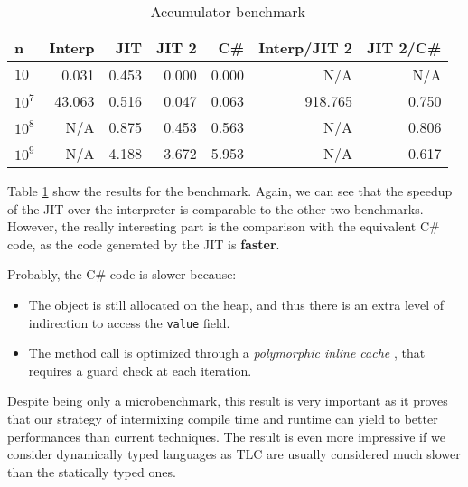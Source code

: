 \begin{table}[ht]
  \begin{tabular}{|l|r|r|r|r||r|r|}
    \hline
    \textbf{n} & 
    \textbf{Interp} &
    \textbf{JIT} &
    \textbf{JIT 2} &
    \textbf{C\#} &
    \textbf{Interp/JIT 2} &
    \textbf{JIT 2/C\#} \\
    \hline

    $10$    &   0.031  &  0.453  &  0.000  &  0.000  &      N/A  &  N/A   \\
    $10^7$  &  43.063  &  0.516  &  0.047  &  0.063  &  918.765  &  0.750 \\
    $10^8$  &     N/A  &  0.875  &  0.453  &  0.563  &      N/A  &  0.806 \\
    $10^9$  &     N/A  &  4.188  &  3.672  &  5.953  &      N/A  &  0.617 \\

    \hline

  \end{tabular}
  \caption{Accumulator benchmark}
  \label{tab:accumulator}
\end{table}


Table \ref{tab:accumulator} show the results for the benchmark.  Again, we can
see that the speedup of the JIT over the interpreter is comparable to the
other two benchmarks.  However, the really interesting part is the comparison
with the equivalent C\# code, as the code generated by the JIT is
\textbf{faster}.

Probably, the C\# code is slower because:

\begin{itemize}
\item The object is still allocated on the heap, and thus there is an extra
  level of indirection to access the \lstinline{value} field.
\item The method call is optimized through a \emph{polymorphic inline cache}
  \cite{hoelzle_optimizing_1991}, that requires a guard check at each iteration.
\end{itemize}


Despite being only a microbenchmark, this result is very important as it proves
that our strategy of intermixing compile time and runtime can yield to better
performances than current techniques.  The result is even more impressive if
we consider dynamically typed languages as TLC are usually considered much
slower than the statically typed ones.
